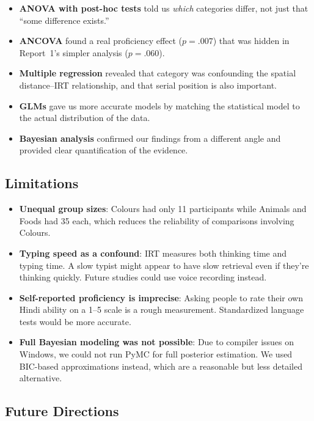 \documentclass[12pt, a4paper]{article}
\begin{document}
\begin{itemize}[nosep]
    \item \textbf{ANOVA with post-hoc tests} told us \textit{which} categories differ, not just that ``some difference exists.''
    \item \textbf{ANCOVA} found a real proficiency effect ($p = .007$) that was hidden in Report~1's simpler analysis ($p = .060$).
    \item \textbf{Multiple regression} revealed that category was confounding the spatial distance--IRT relationship, and that serial position is also important.
    \item \textbf{GLMs} gave us more accurate models by matching the statistical model to the actual distribution of the data.
    \item \textbf{Bayesian analysis} confirmed our findings from a different angle and provided clear quantification of the evidence.
\end{itemize}

\subsection{Limitations}

\begin{itemize}[nosep]
    \item \textbf{Unequal group sizes}: Colours had only 11 participants while Animals and Foods had 35 each, which reduces the reliability of comparisons involving Colours.
    \item \textbf{Typing speed as a confound}: IRT measures both thinking time and typing time. A slow typist might appear to have slow retrieval even if they're thinking quickly. Future studies could use voice recording instead.
    \item \textbf{Self-reported proficiency is imprecise}: Asking people to rate their own Hindi ability on a 1--5 scale is a rough measurement. Standardized language tests would be more accurate.
    \item \textbf{Full Bayesian modeling was not possible}: Due to compiler issues on Windows, we could not run PyMC for full posterior estimation. We used BIC-based approximations instead, which are a reasonable but less detailed alternative.
\end{itemize}

\subsection{Future Directions}
\end{document}
